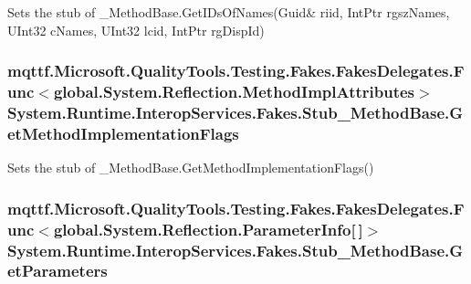 Sets the stub of \-\_\-\-Method\-Base.\-Get\-I\-Ds\-Of\-Names(Guid\& riid, Int\-Ptr rgsz\-Names, U\-Int32 c\-Names, U\-Int32 lcid, Int\-Ptr rg\-Disp\-Id)

\hypertarget{class_system_1_1_runtime_1_1_interop_services_1_1_fakes_1_1_stub___method_base_ad3282c977e37a10d4fa21d714c93fa60}{
\subsubsection[{Get\-Method\-Implementation\-Flags}]{\setlength{\rightskip}{0pt plus 5cm}mqttf.\-Microsoft.\-Quality\-Tools.\-Testing.\-Fakes.\-Fakes\-Delegates.\-Func$<$global.\-System.\-Reflection.\-Method\-Impl\-Attributes$>$ System.\-Runtime.\-Interop\-Services.\-Fakes.\-Stub\-\_\-\-Method\-Base.\-Get\-Method\-Implementation\-Flags}}\label{class_system_1_1_runtime_1_1_interop_services_1_1_fakes_1_1_stub___method_base_ad3282c977e37a10d4fa21d714c93fa60}


Sets the stub of \-\_\-\-Method\-Base.\-Get\-Method\-Implementation\-Flags()

\hypertarget{class_system_1_1_runtime_1_1_interop_services_1_1_fakes_1_1_stub___method_base_a0297426e749e37f408a83e42f8213a64}{
\subsubsection[{Get\-Parameters}]{\setlength{\rightskip}{0pt plus 5cm}mqttf.\-Microsoft.\-Quality\-Tools.\-Testing.\-Fakes.\-Fakes\-Delegates.\-Func$<$global.\-System.\-Reflection.\-Parameter\-Info\mbox{[}$\,$\mbox{]}$>$ System.\-Runtime.\-Interop\-Services.\-Fakes.\-Stub\-\_\-\-Method\-Base.\-Get\-Parameters}}\label{class_system_1_1_runtime_1_1_interop_services_1_1_fakes_1_1_stub___method_base_a0297426e749e37f408a83e42f8213a64}


